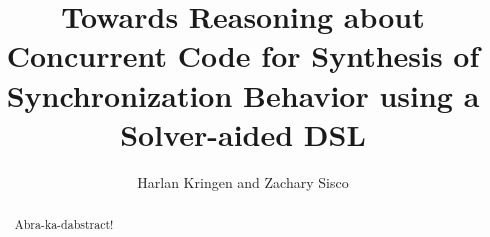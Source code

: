 \documentclass[twocolumn,10pt]{article}
\title{Towards Reasoning about Concurrent Code for Synthesis of Synchronization Behavior using a Solver-aided DSL}
\author{Harlan Kringen and Zachary Sisco}
\date{}
\begin{document}
\maketitle

\begin{abstract}
	Abra-ka-dabstract!
\end{abstract}








\end{document}
